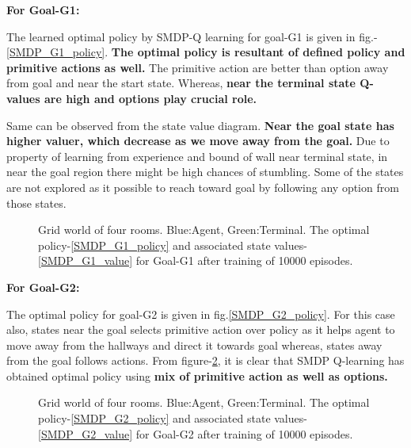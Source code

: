 \documentclass[preprint,12pt]{elsarticle}
\begin{document}
\newpage 

\textbf{For Goal-G1:}

The learned optimal policy by SMDP-Q learning for goal-G1 is given in fig.-\ref{SMDP_G1_policy}. \textbf{The optimal policy is resultant of defined policy and primitive actions as well.} The primitive action are better than option away from goal and near the start state. Whereas, \textbf{near the terminal state Q-values are high and options play crucial role.}

Same can be observed from the state value diagram. \textbf{Near the goal state has higher valuer, which decrease as we move away from the goal.} Due to property of learning from experience and bound of wall near terminal state, in near the goal region there might be high chances of stumbling.  Some of the states are not explored as it possible to reach toward goal by following any option from those states. 

\begin{figure}[H]
	\centering  
	\caption{Grid world of four rooms.  Blue:Agent, Green:Terminal. The optimal policy-\ref{SMDP_G1_policy} and associated state values-\ref{SMDP_G1_value} for Goal-G1 after training of 10000 episodes.}
	\label{fig:SMDP_G1}
\end{figure}

\textbf{For Goal-G2:}

The optimal policy for goal-G2 is given in fig.\ref{SMDP_G2_policy}. For this case also, states near the goal selects primitive action over policy as it helps agent to move away from the hallways and direct it towards goal whereas, states away from the goal follows actions. From figure-\ref{fig:SMDP_G2}, it is clear that SMDP Q-learning has obtained optimal policy using \textbf{mix of primitive action as well as options.}

\begin{figure}[H]
	\centering  
	\caption{Grid world of four rooms.  Blue:Agent, Green:Terminal. The optimal policy-\ref{SMDP_G2_policy} and associated state values-\ref{SMDP_G2_value} for Goal-G2 after training of 10000 episodes.}
	\label{fig:SMDP_G2}
\end{figure}
\end{document}
